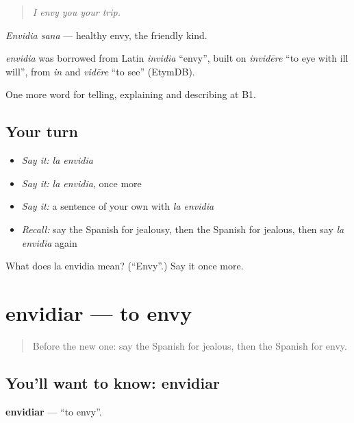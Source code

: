 \begin{quote}
\emph{I envy you your trip.}
\end{quote}

\emph{Envidia sana} — healthy envy, the friendly kind.

\begin{cousinweb}
\emph{envidia} was borrowed from Latin \emph{invidia} \textquotedblleft{}envy\textquotedblright{}, built on \emph{invidēre} \textquotedblleft{}to eye with ill will\textquotedblright{}, from \emph{in} and \emph{vidēre} \textquotedblleft{}to see\textquotedblright{} (EtymDB).
\end{cousinweb}

\begin{grammarlens}[title={What you've built}]
One more word for telling, explaining and describing at B1.
\end{grammarlens}

\subsection*{Your turn}
\begin{itemize}
\raggedright
  \item \emph{Say it:} \emph{la envidia}
  \item \emph{Say it:} \emph{la envidia}, once more
  \item \emph{Say it:} a sentence of your own with \emph{la envidia}
  \item \emph{Recall:} say the Spanish for jealousy, then the Spanish for jealous, then say \emph{la envidia} again
\end{itemize}

\begin{tcolorbox}[breakable,colback=teal!4,colframe=teal!35!black,title={Before you move on}]
What does la envidia mean? (\textquotedblleft{}Envy\textquotedblright{}.) Say it once more.
\end{tcolorbox}
\section[envidiar]{envidiar — to envy}

\label{lesson:ES-C708-envidiar}



\begin{quote}
Before the new one: say the Spanish for jealous, then the Spanish for envy.
\end{quote}

\subsection*{You'll want to know: envidiar}
\textbf{envidiar} — \textquotedblleft{}to envy\textquotedblright{}.

